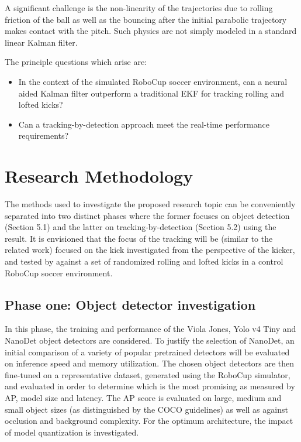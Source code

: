 \documentclass[a4paper,twoside,12pt]{report}
\begin{document}
A significant challenge is the non-linearity of the trajectories due to rolling friction of the ball as well as the bouncing after the initial parabolic trajectory makes contact with the pitch. Such physics are not simply modeled in a standard linear Kalman filter. 

The principle questions which arise are:
\begin{itemize}
    \item In the context of the simulated RoboCup soccer environment, can a neural aided Kalman filter outperform a traditional EKF for tracking rolling and lofted kicks?
	\item Can a tracking-by-detection approach meet the real-time performance requirements?
\end{itemize}

\chapter{Research Methodology}

The methods used to investigate the proposed research topic can be conveniently separated into two distinct phases where the former focuses on object detection (Section 5.1) and the latter on tracking-by-detection (Section 5.2) using the result. It is envisioned that the focus of the tracking will be (similar to the related work) focused on  the kick investigated from the perspective of the kicker, and tested by against a set of randomized rolling and lofted kicks in a control RoboCup soccer environment. 

\section{Phase one: Object detector investigation}

In this phase, the training and performance of the Viola Jones, Yolo v4 Tiny and NanoDet object detectors are considered. To justify the selection of NanoDet, an initial comparison of a variety of popular pretrained detectors will be evaluated on inference speed and memory utilization. The chosen object detectors are then fine-tuned on a representative dataset, generated using the RoboCup simulator, and evaluated in order to determine which is the most promising as measured by AP, model size and latency. The AP score is evaluated on large, medium and small object sizes (as distinguished by the COCO guidelines) as well as against occlusion and background complexity. For the optimum architecture, the impact of model quantization is investigated.
\end{document}
